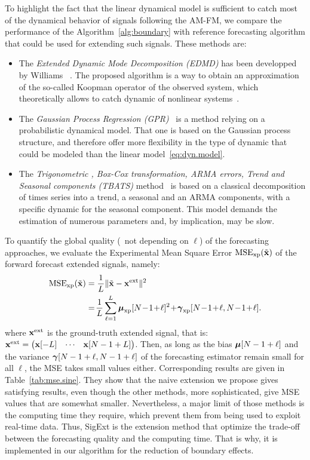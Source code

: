 To highlight the fact that the linear dynamical model is sufficient to catch most of the dynamical behavior of signals following the AM-FM, we compare the performance of the Algorithm~\ref{alg:boundary} with reference forecasting algorithm that could be used for extending such signals. These methods are:
\begin{itemize}
\item The \emph{Extended Dynamic Mode Decomposition (EDMD)} has been developped by Williams \etal~\cite{Williams15data}. The proposed algorithm is a way to obtain an approximation of the so-called Koopman operator of the observed system, which theoretically allows to catch dynamic of nonlinear systems~\cite{Korda18linear}.
\item The \emph{Gaussian Process Regression (GPR)}~\cite{Rasmussen06gaussian} is a method relying on a probabilistic dynamical model. That one is based on the Gaussian process structure, and therefore offer more flexibility in the type of dynamic that could be modeled than the linear model~\eqref{eq:dyn.model}.
\item The \emph{Trigonometric , Box-Cox transformation, ARMA errors, Trend and Seasonal components (TBATS)} method~\cite{DeLivera11forecasting} is based on a classical decomposition of times series into a trend, a seasonal and an ARMA components, with a specific dynamic for the seasonal component. This model demands the estimation of numerous parameters and, by implication, may be slow. 
\end{itemize}

To quantify the global quality (\ie~not depending on $\ell$) of the forecasting approaches, we evaluate the Experimental Mean Square Error $\mathrm{MSE_{xp}}(\tilde{{\mathbf x}})$ of the forward forecast extended signals, namely:
\begin{align}
\label{eq:mse}
\mathrm{MSE_{\xp}}(\tilde\bx) &= \dfrac1{L}\|\tilde\bx -\bx^\mathrm{ext}\|^2 \\
\nonumber
&=\! \dfrac1{L}\sum_{\ell=1}^L \bmu_{\xp}[N\!-\!1\!+\!\ell]^2 \!+\! \bgamma_{\xp}[N\!-\!1\!+\!\ell,N\!-\!1\!+\!\ell] .
\end{align}
where ${\mathbf x}^\mathrm{ext}$ is the ground-truth extended signal, that is: ${\mathbf x}^\mathrm{ext} = \begin{pmatrix}{\mathbf x}[-L] & \cdots & {\mathbf x}[N-1+L] \end{pmatrix}$. Then, as long as the bias $\boldsymbol{\mu}[N-1+\ell]$ and the variance $\boldsymbol{\gamma}[N-1+\ell,N-1+\ell]$ of the forecasting estimator remain small for all $\ell$, the MSE takes small values either. Corresponding results are given in Table~\ref{tab:mse.sine}. They show that the naive extension we propose gives satisfying results, even though the other methods, more sophisticated, give MSE values that are somewhat smaller. Nevertheless, a major limit of those methods is the computing time they require, which prevent them from being used to exploit real-time data. Thus, {\sf SigExt} is the extension method that optimize the trade-off between the forecasting quality and the computing time. That is why, it is implemented in our algorithm for the reduction of boundary effects.

